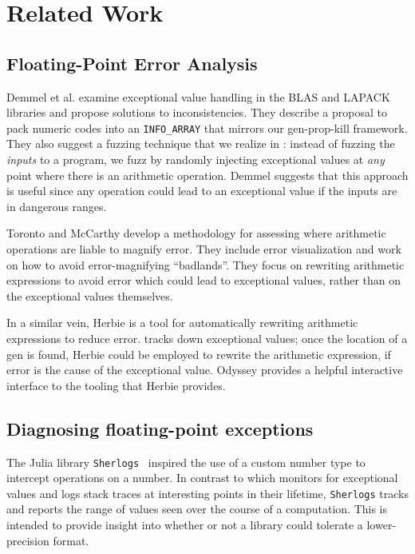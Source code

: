 \documentclass{juliacon}
\begin{document}
\section{Related Work}
\label{s:related}

\subsection{Floating-Point Error Analysis}

Demmel et al.\cite{ddghlllprr-correctness-2022} examine \fp{} exceptional value handling in the BLAS and LAPACK libraries and propose solutions to inconsistencies.
They describe a proposal to pack numeric codes into an \texttt{INFO\_ARRAY} that mirrors our gen-prop-kill framework.
They also suggest a fuzzing technique that we realize in \FT{}:
instead of fuzzing the \emph{inputs} to a program, we fuzz by randomly injecting exceptional values at \emph{any} point where there is an arithmetic operation. Demmel suggests that this approach is useful since any \fp{} operation could lead to an exceptional value if the inputs are in dangerous ranges.

Toronto and McCarthy\cite{torontoPracticallyAccurateFloatingPoint2014} develop a methodology for assessing where arithmetic operations are liable to magnify \fp{} error.
They include error visualization and work on how to avoid error-magnifying ``badlands''.
They focus on rewriting arithmetic expressions to avoid error which could lead to exceptional values, rather than on the exceptional values themselves.

In a similar vein, Herbie\cite{panchekhaAutomaticallyImprovingAccuracy2015} is a tool for automatically rewriting arithmetic expressions to reduce \fp{} error.
\FT{} tracks down exceptional \fp{} values; once the location of a gen is found, Herbie could be employed to rewrite the arithmetic expression, if \fp{} error is the cause of the exceptional value.
Odyssey\cite{misbackOdysseyInteractiveWorkbench2023} provides a helpful interactive interface to the tooling that Herbie provides.

\subsection{Diagnosing floating-point exceptions}

The Julia library \texttt{Sherlogs}~\cite{kMilanklSherlogsJl2021} inspired the use of a custom number type to intercept operations on a number.
In contrast to \FT{} which monitors for exceptional values and logs stack traces at interesting points in their lifetime, \texttt{Sherlogs} tracks and reports the range of values seen over the course of a computation.
This is intended to provide insight into whether or not a library could tolerate a lower-precision \fp{} format.
\end{document}

